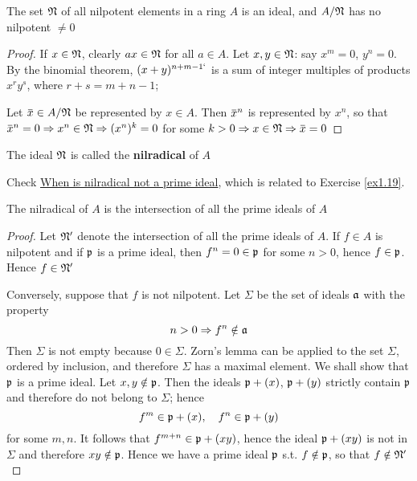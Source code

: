 \documentclass[11pt]{article}
\begin{document}
\begin{proposition}[]
\label{1.7}
The set \(\mathfrak{N}\) of all nilpotent elements in a ring \(A\) is an ideal, and \(A/\mathfrak{N}\) has no
nilpotent \(\neq 0\)
\end{proposition}

\begin{proof}
If \(x\in\mathfrak{N}\), clearly \(ax\in\mathfrak{N}\) for all \(a\in A\). Let \(x,y\in\mathfrak{N}\): say \(x^m=0\), \(y^n=0\). By the
binomial theorem, \((x+y)^{n+m-1`}\) is a sum of integer multiples of products \(x^ry^s\),
where \(r+s=m+n-1\);

Let \(\barx\in A/\fN\) be represented by \(x\in A\). Then \(\barx^n\) is represented by \(x^n\), so
that \(\barx^n=0\Rightarrow x^n\in\fN\Rightarrow(x^n)^k=0\) for some \(k>0\Rightarrow x\in\fN\Rightarrow\barx=0\)
\end{proof}

The ideal \(\mathfrak{N}\) is called the \textbf{nilradical} of \(A\)

Check \href{https://math.stackexchange.com/questions/786393/when-is-nilradical-not-a-prime-ideal}{When is nilradical not a prime ideal}, which is related to Exercise \ref{ex1.19}.

\begin{proposition}[]
\label{1.8}
The nilradical of \(A\) is the intersection of all the prime ideals of \(A\)
\end{proposition}

\begin{proof}
Let \(\mathfrak{N}'\) denote the intersection of all the prime ideals of \(A\). If \(f\in A\) is nilpotent
and if \(\mathfrak{p}\) is a prime ideal, then \(f^n=0\in\mathfrak{p}\) for some \(n>0\), hence \(f\in\mathfrak{p}\). Hence \(f\in\mathfrak{N}'\)

Conversely, suppose that \(f\) is not nilpotent. Let \(\Sigma\) be the set of ideals \(\mathfrak{a}\) with the
property
\begin{equation*}
n>0\Rightarrow f^n\notin\mathfrak{a}
\end{equation*}
Then \(\Sigma\) is not empty because \(0\in\Sigma\). Zorn's lemma can be applied to the set \(\Sigma\), ordered by
inclusion, and therefore \(\Sigma\) has a maximal element. We shall show that \(\mathfrak{p}\) is a prime ideal.
Let \(x,y\notin\mathfrak{p}\). Then the ideals \(\mathfrak{p}+(x)\), \(\mathfrak{p}+(y)\) strictly contain \(\mathfrak{p}\) and therefore do not
belong to \(\Sigma\); hence
\begin{equation*}
f^m\in\mathfrak{p}+(x),\quad f^n\in\mathfrak{p}+(y)
\end{equation*}
for some \(m,n\). It follows that \(f^{m+n}\in\mathfrak{p}+(xy)\), hence the ideal \(\mathfrak{p}+(xy)\) is not in
\(\Sigma\) and therefore \(xy\notin\mathfrak{p}\). Hence we have a prime ideal \(\mathfrak{p}\) s.t. \(f\notin\mathfrak{p}\), so that \(f\notin\mathfrak{N}'\)
\end{proof}
\end{document}
